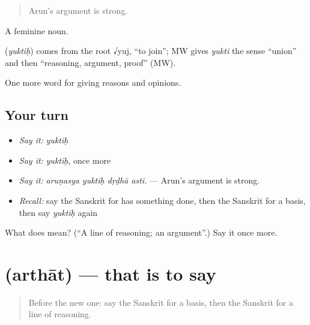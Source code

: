 \begin{quote}
Arun's argument is strong.
\end{quote}

A feminine noun.

\begin{cousinweb}
\textbf{} (\emph{yuktiḥ}) comes from the root √yuj, \textquotedblleft{}to join\textquotedblright{}; MW gives \emph{yukti} the sense \textquotedblleft{}union\textquotedblright{} and then \textquotedblleft{}reasoning, argument, proof\textquotedblright{} (MW).
\end{cousinweb}

\begin{grammarlens}[title={What you've built}]
One more word for giving reasons and opinions.
\end{grammarlens}

\subsection*{Your turn}
\begin{itemize}
\raggedright
  \item \emph{Say it:} \emph{yuktiḥ}
  \item \emph{Say it:} \emph{yuktiḥ}, once more
  \item \emph{Say it:} \emph{aruṇasya yuktiḥ dṛḍhā asti.} — Arun's argument is strong.
  \item \emph{Recall:} say the Sanskrit for has something done, then the Sanskrit for a basis, then say \emph{yuktiḥ} again
\end{itemize}

\begin{tcolorbox}[breakable,colback=teal!4,colframe=teal!35!black,title={Before you move on}]
What does  mean? (\textquotedblleft{}A line of reasoning; an argument\textquotedblright{}.) Say it once more.
\end{tcolorbox}
\section[\texorpdfstring{\sk{अर्थात्} (arthāt)}{अर्थात् (arthāt)}]{ (arthāt) — that is to say}

\label{lesson:SA-C342-arthat}



\begin{quote}
Before the new one: say the Sanskrit for a basis, then the Sanskrit for a line of reasoning.
\end{quote}

